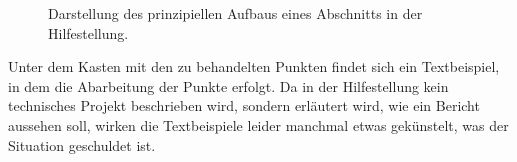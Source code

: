 \begin{figure}[h!]
\caption{Darstellung des prinzipiellen Aufbaus eines Abschnitts in der Hilfestellung.}
\label{fig:seite}
\end{figure}
%
\par
Unter dem Kasten mit den zu behandelten Punkten findet sich ein Textbeispiel, in dem die Abarbeitung der Punkte erfolgt. 
Da in der Hilfestellung kein technisches Projekt beschrieben wird, sondern erläutert wird, wie ein Bericht aussehen soll, wirken die Textbeispiele leider manchmal etwas gekünstelt, was der Situation geschuldet ist. 
